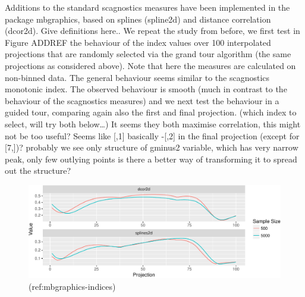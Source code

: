 \documentclass[article]{jss}
\begin{document}
Additions to the standard scagnostics measures have been implemented in
the package mbgraphics, based on splines (spline2d) and distance
correlation (dcor2d). Give definitions here.. We repeat the study from
before, we first test in Figure ADDREF the behaviour of the index values
over 100 interpolated projections that are randomly selected via the
grand tour algorithm (the same projections as considered above). Note
that here the measures are calculated on non-binned data. The general
behaviour seems similar to the scagnostics monotonic index. The observed
behaviour is smooth (much in contrast to the behaviour of the
scagnostics measures) and we next test the behaviour in a guided tour,
comparing again also the first and final projection. (which index to
select, will try both below\ldots{}) It seems they both maximise
correlation, this might not be too useful? Seems like {[},1{]} basically
-{[},2{]} in the final projection (except for {[}7,{]})? probably we see
only structure of gminus2 variable, which has very narrow peak, only few
outlying points is there a better way of transforming it to spread out
the structure?

\begin{CodeChunk}
\begin{figure}

{\centering \includegraphics[width=\textwidth]{figure/mbgraphics-indices-1} 

}

\caption[(ref:mbgraphics-indices)]{(ref:mbgraphics-indices)}\label{fig:mbgraphics-indices}
\end{figure}
\end{CodeChunk}
\end{document}
